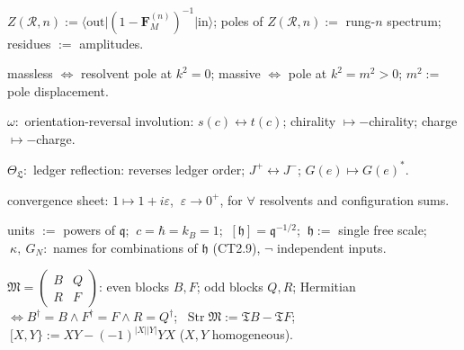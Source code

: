 \begin{definition}[{\texorpdfstring{D2.4}{D2.4}}]\label{tag:D2-4}
$Z(\mathcal R,n):=\bigl\langle\mathrm{out}\bigl|(1-\mathbf F_M^{(n)})^{-1}\bigr|\mathrm{in}\bigr\rangle$; poles of $Z(\mathcal R,n):=$ rung-$n$ spectrum; residues $:=$ amplitudes.

\end{definition}

\begin{definition}[{\texorpdfstring{D2.5}{D2.5}}]\label{tag:D2-5}
massless $\iff$ resolvent pole at $k^2=0$; massive $\iff$ pole at $k^2=m^2>0$; $m^2:=$ pole displacement.

\end{definition}

\begin{definition}[{\texorpdfstring{D2.6}{D2.6}}]\label{tag:D2-6}
$\omega:$ orientation-reversal involution: $s(c)\leftrightarrow t(c)$; chirality $\mapsto-$chirality; charge $\mapsto-$charge.

\end{definition}

\begin{definition}[{\texorpdfstring{D2.7}{D2.7}}]\label{tag:D2-7}
$\Theta_{\mathfrak L}:$ ledger reflection: reverses ledger order; $J^+\leftrightarrow J^-$; $G(e)\mapsto G(e)^\ast$.

\end{definition}

\begin{definition}[{\texorpdfstring{D2.8}{D2.8}}]\label{tag:D2-8}
convergence sheet: $1\mapsto1+i\varepsilon$, $\ \varepsilon\to0^+$, for $\forall$ resolvents and configuration sums.

\end{definition}

\begin{definition}[{\texorpdfstring{D2.9}{D2.9}}]\label{tag:D2-9}
units $:=$ powers of $\mathfrak q$; $\ c=\hbar=k_B=1$; $\ [\mathfrak h]=\mathfrak q^{-1/2}$; $\ \mathfrak h:=$ single free scale; $\ \kappa,\ G_N:$ names for combinations of $\mathfrak h$ (CT2.9), $\neg$ independent inputs.

\end{definition}

\begin{definition}[{\texorpdfstring{D2.10}{D2.10}}]\label{tag:D2-10}
$\mathfrak M=\begin{pmatrix}B&Q\\ R&F\end{pmatrix}$: even blocks $B,F$; odd blocks $Q,R$; Hermitian $\iff B^\dagger=B\wedge F^\dagger=F\wedge R=Q^\dagger$; $\ \operatorname{Str}\mathfrak M:=\mathfrak T B-\mathfrak T F$; $\ [X,Y\}:=XY-(-1)^{|X||Y|}YX$ ($X,Y$ homogeneous).

\end{definition}

